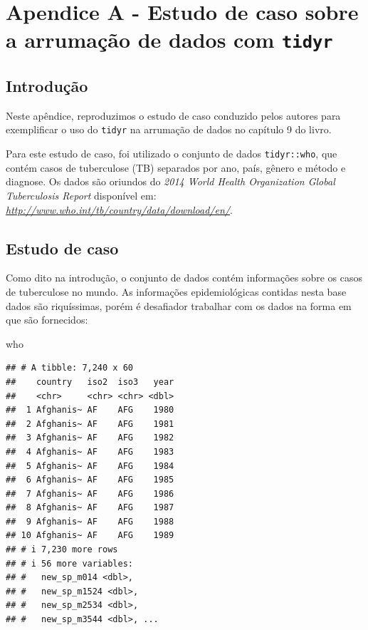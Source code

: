 \documentclass[
]{latex/krantz}
\newenvironment{Shaded}{\begin{snugshade}}{\end{snugshade}}
\newcommand{\NormalTok}[1]{#1}
\theoremstyle{definition}
\theoremstyle{definition}
\theoremstyle{definition}
\theoremstyle{definition}
\theoremstyle{remark}
\begin{document}
\hypertarget{appendix-apuxe9ndices}{%
\appendix {}}


\hypertarget{apendice-a---estudo-de-caso-sobre-a-arrumauxe7uxe3o-de-dados-com-tidyr}{%
\chapter{\texorpdfstring{Apendice A - Estudo de caso sobre a arrumação de dados com \texttt{tidyr}}{Apendice A - Estudo de caso sobre a arrumação de dados com tidyr}}\label{apendice-a---estudo-de-caso-sobre-a-arrumauxe7uxe3o-de-dados-com-tidyr}}

\hypertarget{introduuxe7uxe3o-20}{%
\section*{Introdução}\label{introduuxe7uxe3o-20}}

Neste apêndice, reproduzimos o estudo de caso conduzido pelos autores para exemplificar o uso do \texttt{tidyr} na arrumação de dados no capítulo 9 do livro.

Para este estudo de caso, foi utilizado o conjunto de dados \texttt{tidyr::who}, que contém casos de tuberculose (TB) separados por ano, país, gênero e método e diagnose. Os dados são oriundos do \emph{2014 World Health Organization Global Tuberculosis Report} disponível em: \emph{\url{http://www.who.int/tb/country/data/download/en/}}.

\hypertarget{estudo-de-caso-1}{%
\section*{Estudo de caso}\label{estudo-de-caso-1}}

Como dito na introdução, o conjunto de dados contém informações sobre os casos de tuberculose no mundo. As informações epidemiológicas contidas nesta base dados são riquíssimas, porém é desafiador trabalhar com os dados na forma em que são fornecidos:

\begin{Shaded}
\begin{Highlighting}[]
\NormalTok{who}
\end{Highlighting}
\end{Shaded}

\begin{verbatim}
## # A tibble: 7,240 x 60
##    country   iso2  iso3   year
##    <chr>     <chr> <chr> <dbl>
##  1 Afghanis~ AF    AFG    1980
##  2 Afghanis~ AF    AFG    1981
##  3 Afghanis~ AF    AFG    1982
##  4 Afghanis~ AF    AFG    1983
##  5 Afghanis~ AF    AFG    1984
##  6 Afghanis~ AF    AFG    1985
##  7 Afghanis~ AF    AFG    1986
##  8 Afghanis~ AF    AFG    1987
##  9 Afghanis~ AF    AFG    1988
## 10 Afghanis~ AF    AFG    1989
## # i 7,230 more rows
## # i 56 more variables:
## #   new_sp_m014 <dbl>,
## #   new_sp_m1524 <dbl>,
## #   new_sp_m2534 <dbl>,
## #   new_sp_m3544 <dbl>, ...
\end{verbatim}
\end{document}

